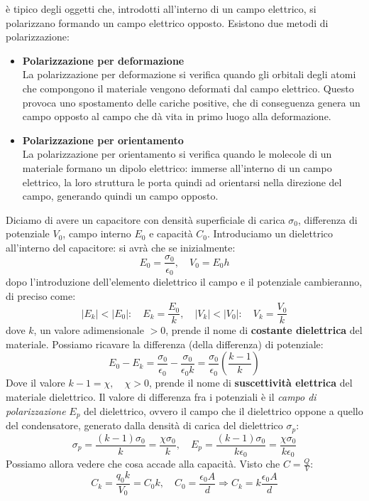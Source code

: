 \documentclass[a4paper,12pt]{article}
\begin{document}
è tipico degli oggetti che, introdotti all'interno di un campo elettrico, si polarizzano formando un campo elettrico opposto. Esistono due metodi di polarizzazione:
\begin{itemize}
  \item \textbf{Polarizzazione per deformazione} \\
    La polarizzazione per deformazione si verifica quando gli orbitali degli atomi che compongono il materiale vengono deformati dal campo elettrico. Questo provoca uno spostamento delle cariche positive, che di conseguenza
    genera un campo opposto al campo che dà vita in primo luogo alla deformazione.
  \item \textbf{Polarizzazione per orientamento} \\
    La polarizzazione per orientamento si verifica quando le molecole di un materiale formano un dipolo elettrico: immerse all'interno di un campo elettrico, la loro struttura le porta quindi ad orientarsi nella direzione del campo,
    generando quindi un campo opposto.
\end{itemize}
Diciamo di avere un capacitore con densità superficiale di carica $\sigma_0$, differenza di potenziale $V_0$, campo interno $E_0$ e capacità $C_0$. Introduciamo un dielettrico all'interno del capacitore: si avrà che se inizialmente:
$$ E_0 = \frac{\sigma_0}{\epsilon_0}, \quad V_0 = E_0 h$$
dopo l'introduzione dell'elemento dielettrico il campo e il potenziale cambieranno, di preciso come:
$$ |E_k| < |E_0|: \quad E_k = \frac{E_0}{k}, \quad |V_k| < |V_0|: \quad V_k = \frac{V_0}{k} $$
dove $k$, un valore adimensionale $>0$, prende il nome di \textbf{costante dielettrica} del materiale. Possiamo ricavare la differenza (della differenza) di potenziale:
$$ E_0 - E_k = \frac{\sigma_0}{\epsilon_0} - \frac{\sigma_0}{\epsilon_0k} = \frac{\sigma_0}{\epsilon_0}\left(\frac{k-1}{k}\right) $$
Dove il valore $k - 1 = \chi, \quad \chi > 0$, prende il nome di \textbf{suscettività elettrica} del materiale dielettrico. Il valore di differenza fra i potenziali è il \textit{campo di polarizzazione} $E_p$ del dielettrico, ovvero il campo
che il dielettrico oppone a quello del condensatore, generato dalla densità di carica del dielettrico $\sigma_p$:
$$ \sigma_p = \frac{(k - 1)\sigma_0}{k} = \frac{\chi \sigma_0}{k}, \quad E_p =  \frac{(k - 1)\sigma_0}{k\epsilon_0} = \frac{\chi \sigma_0}{k\epsilon_0} $$
Possiamo allora vedere che cosa accade alla capacità. Visto che $C = \frac{Q}{V}$:
$$ C_k = \frac{q_0 k}{V_0} = C_0 k, \quad C_0 = \frac{\epsilon_0 A}{d} \Rightarrow C_k = k \frac{\epsilon_0 A}{d} $$
\end{document}
